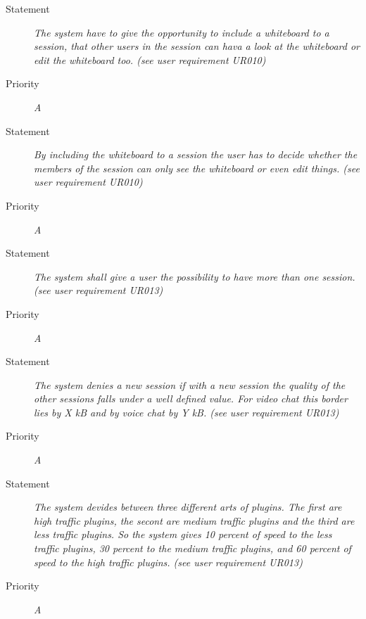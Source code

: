 \FR
\begin{description}
  \item [Statement] 
    \textit{The system have to give the opportunity to include a whiteboard to a session, that other users in the session can hava a look at the whiteboard or edit the whiteboard too.
    (see user requirement UR010)}
  \item [Priority] \textit{A}
\end{description}

\FR
\begin{description}
  \item [Statement] 
    \textit{By including the whiteboard to a session the user has to decide whether the members of the session can only see the whiteboard or even edit things.
    (see user requirement UR010)}
  \item [Priority] \textit{A}
\end{description}

\FR
\begin{description}
  \item [Statement] 
    \textit{The system shall give a user the possibility to have more than one session.
    (see user requirement UR013)}
  \item [Priority] \textit{A}
\end{description}

\FR
\begin{description}
  \item [Statement] 
    \textit{The system denies a new session if with a new session the quality of the other sessions falls under a well defined value. For video chat this border lies by X kB and by voice chat by Y kB.
    (see user requirement UR013)}
  \item [Priority] \textit{A}
\end{description}

\FR
\begin{description}
  \item [Statement] 
    \textit{The system devides between three different arts of plugins. The first are high traffic plugins, the secont are medium traffic plugins and the third are less traffic plugins. So the system gives 10 percent of speed to the less traffic plugins, 30 percent to the medium traffic plugins, and 60 percent of speed to the high traffic plugins.
    (see user requirement UR013)}
  \item [Priority] \textit{A}
\end{description}

